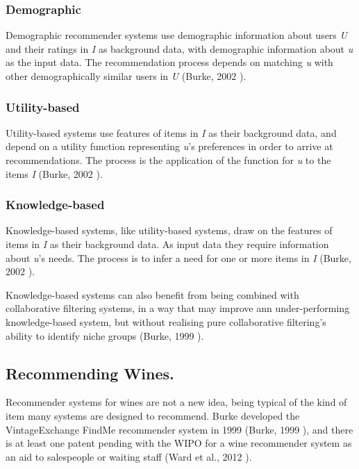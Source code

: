 \subsubsection{Demographic}

Demographic recommender systems use demographic information about users \textit{U} and their ratings in \textit{I} as background data, with demographic information about \textit{u} as the input data. The recommendation process depends on matching \textit{u} with other demographically similar users in \textit{U} (Burke, 2002 \cite{Burke02}).

\subsubsection{Utility-based}

Utility-based systems use features of items in \textit{I} as their background data, and depend on a utility function representing \textit{u}'s preferences in order to arrive at recommendations. The process is the application of the function for \textit{u} to the items \textit{I} (Burke, 2002 \cite{Burke02}).

\subsubsection{Knowledge-based}

Knowledge-based systems, like utility-based systems, draw on the features of items in \textit{I} as their background data. As input data they require information about \textit{u}'s needs. The process is to infer a need for one or more items in \textit{I} (Burke, 2002 \cite{Burke02}).

Knowledge-based systems can also benefit from being combined with collaborative filtering systems, in a way that may improve ann under-performing knowledge-based system, but without realising pure collaborative filtering's ability to identify niche groups (Burke, 1999 \cite{Burke99b}).

\subsection{Recommending Wines.}

Recommender systems for wines are not a new idea, being typical of the kind of item many systems are designed to recommend. Burke developed the VintageExchange FindMe recommender system in 1999 (Burke, 1999 \cite{Burke99}), and there is at least one patent pending with the WIPO for a wine recommender system as an aid to salespeople or waiting staff (Ward et al., 2012 \cite{WIPO12}).

